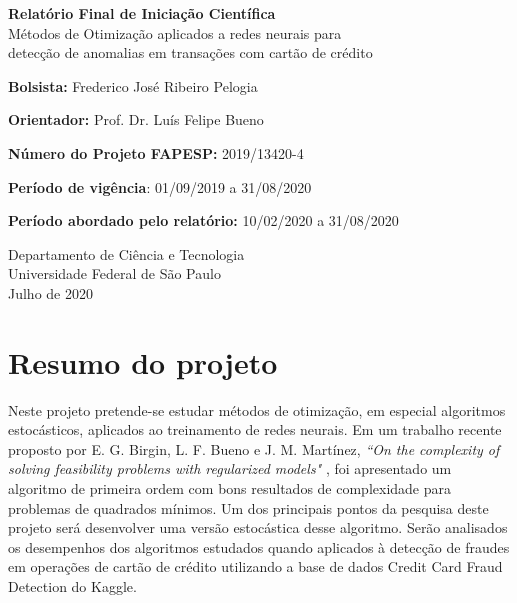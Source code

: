 \documentclass[11pt]{article}
\begin{document}
\begin{titlepage}
   \begin{center}
       \vspace*{1cm}
 
       \Large
       \textbf{Relatório Final de Iniciação Científica}\\
       Métodos de Otimização aplicados a redes neurais para \\ detecção de anomalias em transações com cartão de crédito
 	   
 	   \normalsize
       \vspace{5.5cm}
        \textbf{Bolsista:} Frederico José Ribeiro Pelogia
        
       \vspace{0.5cm}
        \textbf{Orientador:} Prof. Dr. Luís Felipe Bueno
 
       \vspace{0.5cm}
 
       \textbf{Número do Projeto FAPESP:} 2019/13420-4\\
       
      \vspace{0.5cm}
      
		\textbf{Período de vigência}: 01/09/2019 a 31/08/2020    
      
      \vspace{0.5cm}
		\textbf{Período abordado pelo relatório:} 10/02/2020 a 31/08/2020
 
       \vfill

 
 
       Departamento de Ciência e Tecnologia\\
       Universidade Federal de São Paulo\\
       Julho de 2020
 
   \end{center}
\end{titlepage}

\section*{Resumo do projeto}
 Neste projeto pretende-se estudar métodos de otimização, em especial algoritmos estocásticos,
aplicados ao treinamento de redes neurais. Em um trabalho\cite{bmLS} recente proposto por E. G. Birgin, L. F. Bueno e
J. M. Martínez, \textit{``On the complexity of solving feasibility problems with regularized models"} , foi apresentado um algoritmo
de primeira ordem com bons resultados de complexidade para problemas de quadrados mínimos.
Um dos principais pontos da pesquisa deste projeto será desenvolver uma versão estocástica desse
algoritmo. Serão analisados os desempenhos dos algoritmos estudados quando aplicados à detecção
de fraudes em operações de cartão de crédito utilizando a base de dados Credit Card Fraud Detection
do Kaggle.
\end{document}
